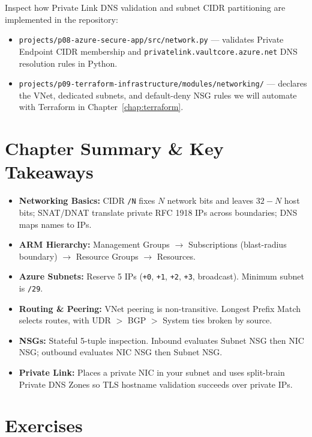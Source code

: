 \begin{labbridgebox}
Inspect how Private Link DNS validation and subnet CIDR partitioning are implemented in the repository:
\begin{itemize}[leftmargin=12pt]
  \item \texttt{projects/p08-azure-secure-app/src/network.py} --- validates Private Endpoint CIDR membership and \texttt{privatelink.vaultcore.azure.net} DNS resolution rules in Python.
  \item \texttt{projects/p09-terraform-infrastructure/modules/networking/} --- declares the VNet, dedicated subnets, and default-deny NSG rules we will automate with Terraform in Chapter~\ref{chap:terraform}.
\end{itemize}
\end{labbridgebox}

\section{Chapter Summary \protect\& Key Takeaways}
\begin{itemize}[leftmargin=15pt]
  \item \textbf{Networking Basics:} CIDR \texttt{/N} fixes $N$ network bits and leaves $32-N$ host bits; SNAT/DNAT translate private RFC 1918 IPs across boundaries; DNS maps names to IPs.
  \item \textbf{ARM Hierarchy:} Management Groups $\to$ Subscriptions (blast-radius boundary) $\to$ Resource Groups $\to$ Resources.
  \item \textbf{Azure Subnets:} Reserve 5 IPs (\texttt{+0}, \texttt{+1}, \texttt{+2}, \texttt{+3}, broadcast). Minimum subnet is \texttt{/29}.
  \item \textbf{Routing \& Peering:} VNet peering is non-transitive. Longest Prefix Match selects routes, with UDR $>$ BGP $>$ System ties broken by source.
  \item \textbf{NSGs:} Stateful 5-tuple inspection. Inbound evaluates Subnet NSG then NIC NSG; outbound evaluates NIC NSG then Subnet NSG.
  \item \textbf{Private Link:} Places a private NIC in your subnet and uses split-brain Private DNS Zones so TLS hostname validation succeeds over private IPs.
\end{itemize}

\section{Exercises}

